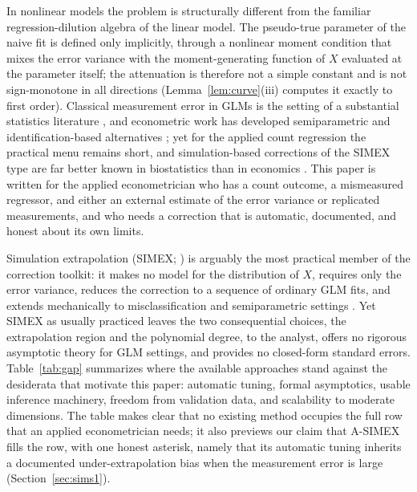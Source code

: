 \documentclass[3p,11pt]{elsarticle}
\theoremstyle{plain}
\theoremstyle{definition}
\begin{document}
In nonlinear models the problem is structurally different from the
familiar regression-dilution algebra of the linear model. The
pseudo-true parameter of the naive fit is defined only implicitly,
through a nonlinear moment condition that mixes the error variance
with the moment-generating function of $X$ evaluated at the parameter
itself; the attenuation is therefore not a simple constant and is not
sign-monotone in all directions
(Lemma~\ref{lem:curve}(iii) computes it exactly to first order).
Classical measurement error in GLMs is the setting of a substantial
statistics literature \citep{carroll2006}, and econometric work has
developed semiparametric and identification-based alternatives
\citep{lewbel1997,schennach2004,mahajan2006,hu2008}; yet for the
applied count regression the practical menu remains short, and
simulation-based corrections of the SIMEX type are far better known in
biostatistics than in economics \citep{nakamura1990,cook1994}. This
paper is written for the applied econometrician who has a count
outcome, a mismeasured regressor, and either an external estimate of
the error variance or replicated measurements, and who needs a
correction that is automatic, documented, and honest about its own
limits.

Simulation extrapolation (SIMEX; \citealp{cook1994,stefanski1995}) is
arguably the most practical member of the correction toolkit: it makes
no model for the distribution of $X$, requires only the error
variance, reduces the correction to a sequence of ordinary GLM fits,
and extends mechanically to misclassification
\citep{kuechenhoff2006} and semiparametric settings
\citep{apanasovich2009}. Yet SIMEX as usually practiced leaves the two
consequential choices, the extrapolation region and the polynomial
degree, to the analyst, offers no rigorous asymptotic theory for
GLM settings, and provides no closed-form standard errors. Table~\ref{tab:gap}
summarizes where the available approaches stand against the
desiderata that motivate this paper: automatic tuning, formal
asymptotics, usable inference machinery, freedom from validation
data, and scalability to moderate dimensions. The table makes clear
that no existing method occupies the full row that an applied
econometrician needs; it also previews our claim that A-SIMEX fills
the row, with one honest asterisk, namely that its automatic
tuning inherits a documented under-extrapolation bias when the
measurement error is large (Section~\ref{sec:sims1}).
\end{document}
